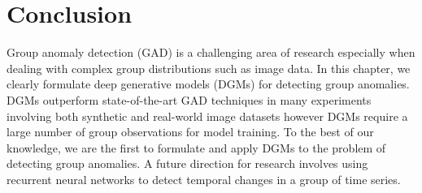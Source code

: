 \section{Conclusion} 
\label{sec:conclusion} 
Group anomaly detection (GAD) is a challenging area of research especially when dealing with complex group distributions such as image data. In this chapter, we clearly formulate deep generative models (DGMs)  for  detecting group anomalies.   %
 DGMs outperform state-of-the-art GAD techniques in many experiments involving both synthetic and real-world image datasets however DGMs require a large number of group observations for model training. To the best of our knowledge, we are the first to formulate and apply DGMs to the problem of detecting group anomalies. A future direction for research involves using recurrent neural networks  to detect  temporal changes in a group of time series. 
 



